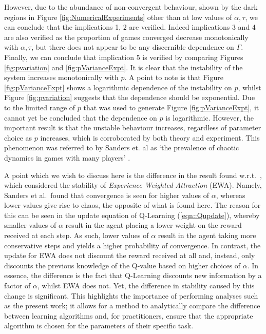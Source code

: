 \documentclass[sigconf,anonymous]{aamas}
\begin{document}
However, due to the abundance of non-convergent behaviour, shown by the dark regions in Figure \ref{fig:NumericalExperiments} other than at low values of $\alpha, \tau$, we can conclude that the implications 1, 2 are verified. Indeed implications 3 and 4 are also verified as the proportion of games converged decrease monotonically with $\alpha, \tau$, but there does not appear to be any discernible dependence on $\Gamma$. Finally, we can conclude that implication 5 is verified by comparing Figures \ref{fig:pvariation} and \ref{fig:pVarianceExpt}. It is clear that the instability of the system increases monotonically with $p$. A point to note is that Figure \ref{fig:pVarianceExpt} shows a logarithmic dependence of the instability on $p$, whilst Figure \ref{fig:pvariation} suggests that the dependence should be exponential. Due to the limited range of $p$ that was used to generate Figure \ref{fig:pVarianceExpt}, it cannot yet be concluded that the dependence on $p$ is logarithmic. However, the important result is that the unstable behaviour increases, regardless of parameter choice as $p$ increases, which is corroborated by both theory and experiment. This phenomenon was referred to by Sanders et. al as `the prevalence of chaotic dynamics in games with many players' \cite{Sanders2018}. 

A point which we wish to discuss here is the difference in the result found w.r.t.~\cite{Sanders2018}, which considered the stability of \textit{Experience Weighted Attraction} (EWA). Namely, Sanders et al.~found that convergence is seen for higher values of $\alpha$, whereas lower values give rise to chaos, the opposite of what is found here. The reason for this can be seen in the update equation of Q-Learning (\ref{eqn::Qupdate}), whereby
smaller values of $\alpha$ result in the agent placing a lower weight on the reward received at each step. As such, lower values of $\alpha$ result in the agent taking more conservative steps and yields a higher probability of convergence. In contrast, the update for EWA does not discount the reward received at all and, instead, only discounts the previous knowledge of the Q-value based on higher choices of $\alpha$. In essence, the difference is the fact that Q-Learning discounts new information by a factor of $\alpha$, whilst EWA does not. Yet, the difference in stability caused by this change is significant. This highlights the importance of performing analyses such as the present work; it allows for a method to analytically compare the difference between learning algorithms and, for practitioners, ensure that the appropriate algorithm is chosen for the parameters of their specific task.
\end{document}
